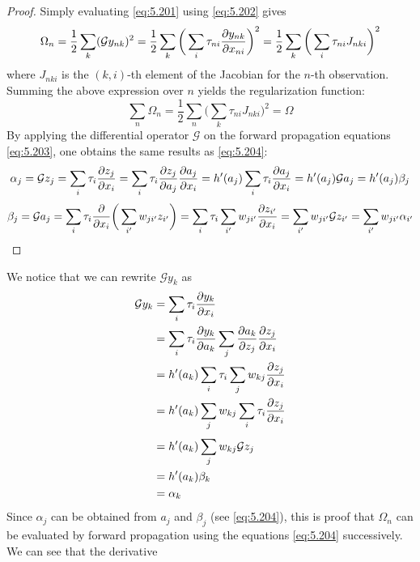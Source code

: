 \vspace{1em}

\begin{proof}
    Simply evaluating \eqref{eq:5.201} using \eqref{eq:5.202} gives
    \[
        \Omega_n 
        = \frac{1}{2}\sum_{k}(\mathcal{G} y_{nk})^2
        = \frac{1}{2}\sum_{k}\bigg(\sum_{i} \tau_{ni} \pdv{y_{nk}}{x_{ni}}\bigg)^2
        = \frac{1}{2}\sum_{k}\bigg(\sum_{i} \tau_{ni} J_{nki}\bigg)^2
    \] 
    where 
    $J_{nki}$ is the $(k, i)$-th element of the Jacobian for the $n$-th observation.
    Summing the above expression over $n$ yields the regularization function:
    \begin{equation}\label{eq:5.128}\tag{5.128}
        \sum_{n} \Omega_n = \frac{1}{2} \sum_{n} \bigg(\sum_{k} \tau_{ni} J_{nki}\bigg)^2 = \Omega
    \end{equation}
    By applying the differential operator $\mathcal{G}$ on the forward propagation equations
    \eqref{eq:5.203}, one obtains the same results as \eqref{eq:5.204}:
    \[
        \alpha_j 
        = \mathcal{G}z_j 
        = \sum_{i} \tau_i \pdv{z_j}{x_i}
        = \sum_{i} \tau_i \pdv{z_j}{a_j} \pdv{a_j}{x_i}
        = h'(a_j) \sum_{i} \tau_i \pdv{a_j}{x_i}
        = h'(a_j) \mathcal{G} a_j
        = h'(a_j) \beta_j
    \] 
    \[
        \beta_j
        = \mathcal{G}a_j
        = \sum_{i} \tau_i \pdv{x_i}\bigg(\sum_{i'} w_{ji'} z_{i'}\bigg)
        = \sum_{i} \tau_i \sum_{i'} w_{ji'} \pdv{z_{i'}}{x_i}
        = \sum_{i'} w_{ji'} \mathcal{G} z_{i'}
        = \sum_{i'} w_{ji'} \alpha_{i'}
    \] 
\end{proof}
We notice that we can rewrite $\mathcal{G} y_{k}$ as
\begin{align*}
    \mathcal{G}y_k 
    &= \sum_{i}^{} \tau_i \pdv{y_k}{x_i} \\
    &= \sum_{i}^{} \tau_i \pdv{y_k}{a_k} \sum_{j} \pdv{a_k}{z_j} \pdv{z_j}{x_i} \\
    &= h'(a_k) \sum_{i}^{} \tau_i \sum_{j}^{} w_{kj} \pdv{z_j}{x_i} \\
    &= h'(a_k) \sum_{j}^{} w_{kj} \sum_{i}^{} \tau_i \pdv{z_j}{x_i} \\
    &= h'(a_k) \sum_{j}^{} w_{kj} \mathcal{G} z_j \\
    &= h'(a_k) \beta_k \\
    &= \alpha_k
\end{align*}
Since $\alpha_j$ can be obtained from $a_j$ and $\beta_j$ (see \eqref{eq:5.204}),
this is proof that $\Omega_n$ can be evaluated by forward propagation using the 
equations \eqref{eq:5.204} successively. We can see that the derivative
